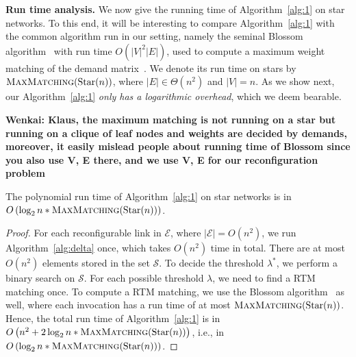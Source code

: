 \documentclass[sigconf]{acmart}
\newcommand{\E}{\mathcal{E}}  %
\newcommand\wenkai[1]{\color{green}\textbf{Wenkai: #1}\color{black}}
\begin{document}
\noindent\textbf{Run time analysis.} We now give the running time of Algorithm~\ref{alg:1} on star networks.
To this end, it will be interesting to compare Algorithm~\ref{alg:1} with the common algorithm run in our setting, namely the seminal Blossom algorithm~\cite{Edmonds1965} with run time $O(\left| V\right| ^2\left| E\right| )$, used to compute a maximum weight matching of the demand matrix~\cite{cthrough}.
We denote its run time on stars by $\textsc{MaxMatching}(\textnormal{Star}(n))$, where $\left|E\right| \in \Theta(n^2)$ and $\left|V\right|=n$.
As we show next, our Algorithm~\ref{alg:1} \emph{only has a logarithmic overhead}, which we deem bearable.

\wenkai{Klaus, the maximum matching is not running on a star but running on a clique of leaf nodes and weights are decided by demands, moreover, it easily mislead people about running time of Blossom since you also use V, E there, and we use V, E for our reconfiguration problem}
\begin{theorem}
The polynomial run time of Algorithm~\ref{alg:1} on star networks is in $O\left(\log_2n*\textsc{MaxMatching}(\textnormal{Star}(n))\right)$. \label{thm:runtime}
\end{theorem}

\begin{proof}
For each reconfigurable link in $\E$, where $\left| \E\right| =O(n^2)$, we run Algorithm~\ref{alg:delta} once, which takes $O(n^2)$ time in total.
%
There are at most $O(n^2)$ elements stored in the set $\mathcal{S}$. 
%
To decide the threshold $\lambda^*$, we perform a binary search on $\mathcal{S}$. 
%
For each possible threshold $\lambda$, we need to find a RTM matching once. 
%
To compute a RTM matching, we use the Blossom algorithm~\cite{Edmonds1965} as well, where each invocation has a run time of at most $\textsc{MaxMatching}(\textnormal{Star}(n))$.
%
Hence, the total run time of Algorithm~\ref{alg:1} is in $O\left( n^2+2\log_2n*\textsc{MaxMatching}(\textnormal{Star}(n))\right)$, i.e., in $O\left(\log_2n*\textsc{MaxMatching}(\textnormal{Star}(n))\right)$.
%
\end{proof}
\end{document}
